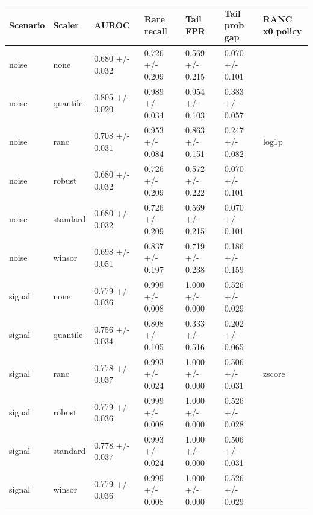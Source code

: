 \begin{tabular}{lllllll}
\toprule
Scenario & Scaler & AUROC & Rare recall & Tail FPR & Tail prob gap & RANC x0 policy \\
\midrule
noise & none & 0.680 +/- 0.032 & 0.726 +/- 0.209 & 0.569 +/- 0.215 & 0.070 +/- 0.101 &  \\
noise & quantile & 0.805 +/- 0.020 & 0.989 +/- 0.034 & 0.954 +/- 0.103 & 0.383 +/- 0.057 &  \\
noise & ranc & 0.708 +/- 0.031 & 0.953 +/- 0.084 & 0.863 +/- 0.151 & 0.247 +/- 0.082 & log1p \\
noise & robust & 0.680 +/- 0.032 & 0.726 +/- 0.209 & 0.572 +/- 0.222 & 0.070 +/- 0.101 &  \\
noise & standard & 0.680 +/- 0.032 & 0.726 +/- 0.209 & 0.569 +/- 0.215 & 0.070 +/- 0.101 &  \\
noise & winsor & 0.698 +/- 0.051 & 0.837 +/- 0.197 & 0.719 +/- 0.238 & 0.186 +/- 0.159 &  \\
signal & none & 0.779 +/- 0.036 & 0.999 +/- 0.008 & 1.000 +/- 0.000 & 0.526 +/- 0.029 &  \\
signal & quantile & 0.756 +/- 0.034 & 0.808 +/- 0.105 & 0.333 +/- 0.516 & 0.202 +/- 0.065 &  \\
signal & ranc & 0.778 +/- 0.037 & 0.993 +/- 0.024 & 1.000 +/- 0.000 & 0.506 +/- 0.031 & zscore \\
signal & robust & 0.779 +/- 0.036 & 0.999 +/- 0.008 & 1.000 +/- 0.000 & 0.526 +/- 0.028 &  \\
signal & standard & 0.778 +/- 0.037 & 0.993 +/- 0.024 & 1.000 +/- 0.000 & 0.506 +/- 0.031 &  \\
signal & winsor & 0.779 +/- 0.036 & 0.999 +/- 0.008 & 1.000 +/- 0.000 & 0.526 +/- 0.029 &  \\
\bottomrule
\end{tabular}
